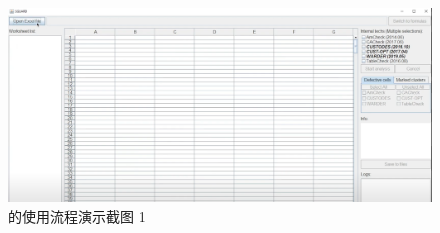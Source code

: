 \begin{figure}[tbp]    
    \centering
    \includegraphics[width=\textwidth]{figure/sg/sguard-1.png}
    \caption{\sg 的使用流程演示截图 1}
    \label{figure-sg1}
\end{figure}